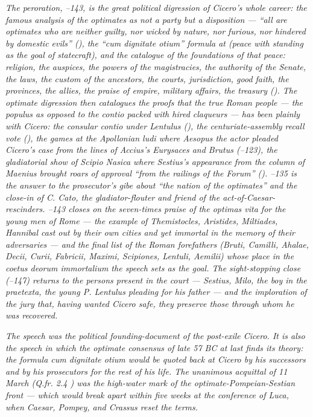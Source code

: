 \textit{The peroration, --143, is the great
political digression of Cicero's whole career: the famous
analysis of the \textit{optimates} as not a party but a
disposition --- ``all are \textit{optimates} who are neither
guilty, nor wicked by nature, nor furious, nor hindered by
domestic evils'' (), the ``cum dignitate
otium'' formula at  (peace with standing as
the goal of statecraft), and the catalogue of the foundations
of that peace: religion, the auspices, the powers of the
magistracies, the authority of the Senate, the laws, the
custom of the ancestors, the courts, jurisdiction, good
faith, the provinces, the allies, the praise of empire,
military affairs, the treasury (). The
optimate digression then catalogues the proofs that the
true Roman people --- the \textit{populus} as opposed to
the \textit{contio} packed with hired claqueurs --- has been
plainly with Cicero: the consular contio under Lentulus
(), the centuriate-assembly recall vote
(), the games at the Apollonian \textit{ludi}
where Aesopus the actor pleaded Cicero's case from the lines
of Accius's \textit{Eurysaces} and \textit{Brutus}
(--123), the gladiatorial show of Scipio
Nasica where Sestius's appearance from the column of Maenius
brought roars of approval ``from the railings of the Forum''
(). --135 is the answer to
the prosecutor's gibe about ``the nation of the
\textit{optimates}'' and the close-in of C. Cato, the
gladiator-flouter and friend of the act-of-Caesar-rescinders.
--143 closes on the seven-times praise of the
\textit{optimas vita} for the young men of Rome --- the
example of Themistocles, Aristides, Miltiades, Hannibal cast
out by their own cities and yet immortal in the memory of
their adversaries --- and the final list of the Roman
forefathers (Bruti, Camilli, Ahalae, Decii, Curii, Fabricii,
Maximi, Scipiones, Lentuli, Aemilii) whose place in the
\textit{coetus deorum immortalium} the speech sets as the goal.
The sight-stopping close (--147) returns to
the persons present in the court --- Sestius, Milo, the boy
in the praetexta, the young P. Lentulus pleading for his
father --- and the imploration of the jury that, having wanted
Cicero safe, they preserve those through whom he was recovered.}

\textit{The speech was the political founding-document of
the post-exile Cicero. It is also the speech in which the
optimate consensus of late 57 BC at last finds its theory:
the formula \textit{cum dignitate otium} would be quoted
back at Cicero by his successors and by his prosecutors for
the rest of his life. The unanimous acquittal of 11 March
(Q.fr. 2.4 ) was the high-water mark of the
optimate-Pompeian-Sestian front --- which would break apart
within five weeks at the conference of Luca, when Caesar,
Pompey, and Crassus reset the terms.}
